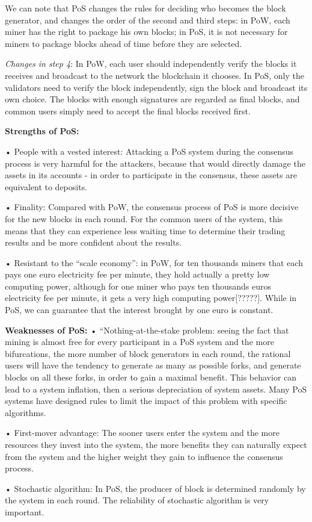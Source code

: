 \documentclass[doublespacing]{bmcart}
\begin{document}
\begin{CJK*}{UTF8}{gbsn}
	We can note that PoS changes the rules for deciding who becomes the block generator, and changes the order of the second and third steps: in PoW, each miner has the right to package his own blocks; in PoS, it is not necessary for miners to package blocks ahead of time before they are selected.
	
	\textsl{Changes in step 4}: In PoW, each user should independently verify the blocks it receives and broadcast to the network the blockchain it chooses. In PoS, only the validators need to verify the block independently, sign the block and broadcast its own choice. The blocks with enough signatures are regarded as final blocks, and common users simply need to accept the final blocks received first.

	\textbf{Strengths of PoS:}	
    \par • People with a vested interest: Attacking a PoS system during the consensus process is very harmful for the attackers, because that would directly damage the assets in its accounts - in order to participate in the consensus, these assets are equivalent to deposits.
    \par • Finality: Compared with PoW, the consensus process of PoS is more decisive for the new blocks in each round. For the common users of the system, this means that they can experience less waiting time to determine their trading results and be more confident about the results.
    \par • Resistant to the “scale economy”: in PoW, for ten thousands miners that each pays one euro electricity fee per minute, they hold actually a pretty low computing power, although for one miner who pays ten thousands euros electricity fee per minute, it gets a very high computing power[?????]. While in PoS, we can guarantee that the interest brought by one euro is constant.
    \par \textbf{Weaknesses of PoS:}	
    • “Nothing-at-the-stake problem: seeing the fact that mining is almost free for every participant in a PoS system and the more bifurcations, the more number of block generators in each round, the rational users will have the tendency to generate as many as possible forks, and generate blocks on all these forks, in order to gain a maximal benefit. This behavior can lead to a system inflation, then a serious depreciation of system assets. Many PoS systems have designed rules to limit the impact of this problem with specific algorithms.
    \par • First-mover advantage: The sooner users enter the system and the more resources they invest into the system, the more benefits they can naturally expect from the system and the higher weight they gain to influence the consensus process.
    \par • Stochastic algorithm: In PoS, the producer of block is determined randomly by the system in each round. The reliability of stochastic algorithm is very important.
    

\end{CJK*}
\end{document}
